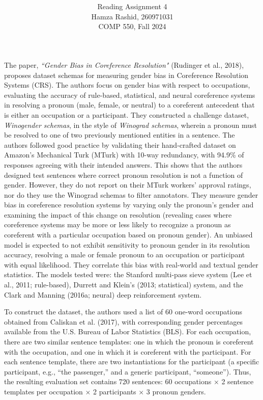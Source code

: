 \documentclass[11pt]{article}
\title{ }
\author{Reading Assignment 4 \\ Hamza Rashid, 260971031 \\ COMP 550, Fall 2024}
\date{}
\begin{document}
\maketitle

\vspace{-4ex}
The paper, \textit{``Gender Bias in Coreference Resolution"} 
(Rudinger et al., 2018), proposes dataset schemas for measuring 
gender bias in Coreference Resolution Systems (CRS). The authors 
focus on gender bias with respect to occupations, 
evaluating the accuracy of rule-based, statistical, and neural 
coreference systems in resolving a pronoun (male, female, or neutral) 
to a coreferent antecedent that is either an occupation or a participant. 
They constructed a challenge dataset, \textit{Winogender schemas}, 
in the style of \textit{Winograd schemas}, wherein a pronoun must be resolved to one of two previously mentioned 
entities in a sentence. The authors followed good practice 
by validating their hand-crafted dataset on Amazon's Mechanical Turk (MTurk) with 10-way
redundancy, with 94.9\% of responses agreeing with their intended answers. This shows that
the authors designed test sentences where correct pronoun resolution is not a function of gender. However,
they do not report on their MTurk workers' approval ratings, nor do they use the Winograd schemas to filter annotators. They measure gender bias in coreference resolution systems by 
varying only the pronoun's gender and examining the impact of this change on resolution (revealing cases where coreference
systems may be more or less likely to recognize a pronoun as coreferent with a particular occupation
based on pronoun gender). An unbiased model is expected to not exhibit sensitivity to pronoun gender in its resolution accuracy, resolving a male or female 
pronoun to an occupation or participant with equal likelihood. They correlate this bias with
real-world and textual gender statistics. The models tested were:
the Stanford multi-pass sieve system (Lee et al., 2011; rule-based), Durrett and Klein's (2013; statistical) system, 
and the Clark and Manning (2016a; neural) deep reinforcement system.

To construct the dataset, the authors 
used a list of 60 one-word occupations obtained from Caliskan et al. (2017), 
with corresponding gender percentages
available from the U.S. Bureau of Labor Statistics (BLS). For each occupation, there are two similar
sentence templates: one in which the pronoun is
coreferent with the occupation, and one in which
it is coreferent with the participant.
For each sentence template, there are two instantiations for the participant (a specific
participant, e.g., “the passenger,” and a generic
participant, “someone”). Thus, the resulting evaluation set contains 720 sentences: 60 occupations × 2 sentence templates per
occupation × 2 participants × 3 pronoun genders.
\end{document}
